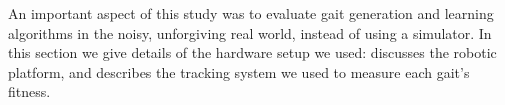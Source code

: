 
An important aspect of this study was to evaluate gait generation and
learning algorithms in the noisy, unforgiving real world, instead of
using a simulator.  In this section we give details of the hardware
setup we used:  discusses the robotic
platform, and  describes the tracking system
we used to measure each gait's fitness.





